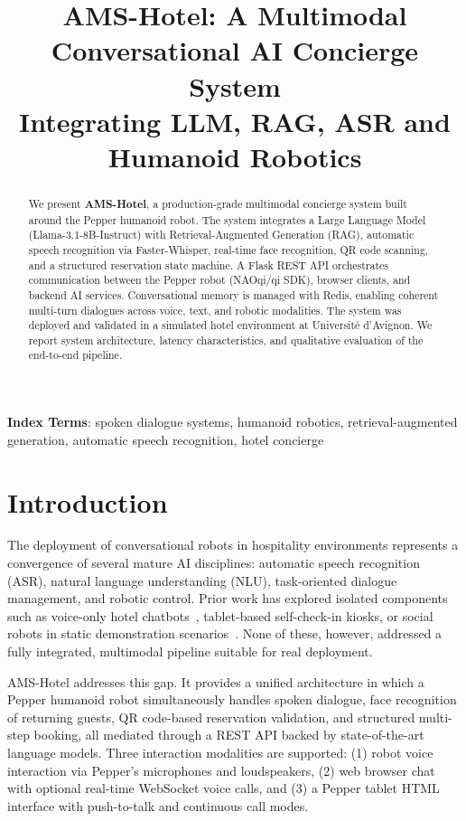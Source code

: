 \documentclass[a4paper]{article}
\title{AMS-Hotel: A Multimodal Conversational AI Concierge System\\
       Integrating LLM, RAG, ASR and Humanoid Robotics}
\begin{document}
\maketitle

\begin{abstract}
We present \textbf{AMS-Hotel}, a production-grade multimodal concierge system built around the Pepper humanoid robot. The system integrates a Large Language Model (Llama-3.1-8B-Instruct) with Retrieval-Augmented Generation (RAG), automatic speech recognition via Faster-Whisper, real-time face recognition, QR code scanning, and a structured reservation state machine. A Flask REST API orchestrates communication between the Pepper robot (NAOqi/qi SDK), browser clients, and backend AI services. Conversational memory is managed with Redis, enabling coherent multi-turn dialogues across voice, text, and robotic modalities. The system was deployed and validated in a simulated hotel environment at Universit\'e d'Avignon. We report system architecture, latency characteristics, and qualitative evaluation of the end-to-end pipeline.
\end{abstract}
\noindent\textbf{Index Terms}: spoken dialogue systems, humanoid robotics, retrieval-augmented generation, automatic speech recognition, hotel concierge

\section{Introduction}

The deployment of conversational robots in hospitality environments represents a convergence of several mature AI disciplines: automatic speech recognition (ASR), natural language understanding (NLU), task-oriented dialogue management, and robotic control. Prior work has explored isolated components such as voice-only hotel chatbots~\cite{bickmore2005}, tablet-based self-check-in kiosks, or social robots in static demonstration scenarios~\cite{saerbeck2010}. None of these, however, addressed a fully integrated, multimodal pipeline suitable for real deployment.

AMS-Hotel addresses this gap. It provides a unified architecture in which a Pepper humanoid robot simultaneously handles spoken dialogue, face recognition of returning guests, QR code-based reservation validation, and structured multi-step booking, all mediated through a REST API backed by state-of-the-art language models. Three interaction modalities are supported: (1) robot voice interaction via Pepper's microphones and loudspeakers, (2) web browser chat with optional real-time WebSocket voice calls, and (3) a Pepper tablet HTML interface with push-to-talk and continuous call modes.
\end{document}
